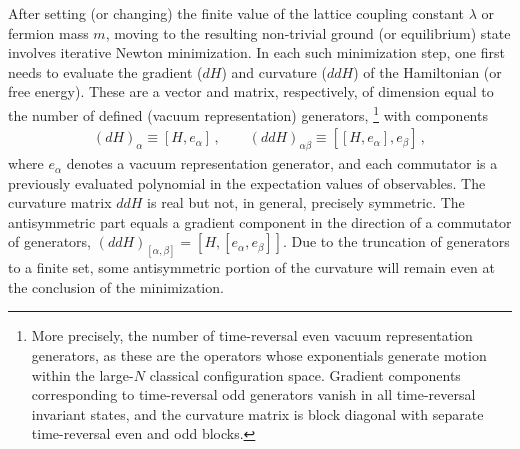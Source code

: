 \documentclass [12pt]{article}
\begin{document}
After setting (or changing) the finite value of the
lattice coupling constant $\lambda$
or fermion mass $m$,
moving to the resulting non-trivial ground (or equilibrium)
state involves iterative Newton minimization.
In each such minimization step,
one first needs to evaluate the gradient ($dH$) and curvature ($ddH$) of the
Hamiltonian (or free energy).
These are a vector and matrix, respectively, of dimension
equal to the number of defined (vacuum representation) generators,%
\footnote
    {%
    More precisely, the number of time-reversal even 
    vacuum representation generators, as these are the
    operators whose exponentials generate motion within
    the large-$N$ classical configuration space.
    Gradient components corresponding to time-reversal
    odd generators vanish in all time-reversal invariant
    states, and the curvature matrix is block diagonal
    with separate time-reversal even and odd blocks.
    }
with components
\begin{align}
    (dH)_\alpha \equiv [H, e_\alpha] \,,\qquad
    (ddH)_{\alpha\beta} \equiv [ [ H, e_\alpha], e_\beta] \,,
\label{eq:gradcurv}
\end{align}
where $e_\alpha$ denotes 
a vacuum representation generator,
and each commutator is a previously evaluated polynomial in the
expectation values of observables.
The curvature matrix $ddH$ is real but not, in general,
precisely symmetric.
The antisymmetric part equals
a gradient component in the direction of
a commutator of generators,
$
    (ddH)_{[\alpha, \beta]}
    =
    [H, [e_\alpha, e_\beta]]
$.
Due to the truncation of generators to a finite set,
some antisymmetric portion of the curvature will remain even
at the conclusion of the minimization.
%
\end{document}
